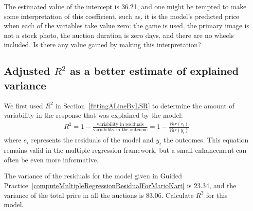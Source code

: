\begin{exercisewrap}
\begin{nexercise}
The estimated value of the intercept is 36.21, and one might be tempted to make some interpretation of this coefficient, such as, it is the model's predicted price when each of the variables take value zero: the game is used, the primary image is not a stock photo, the auction duration is zero days, and there are no wheels included. Is there any value gained by making this interpretation?\footnotemark
\end{nexercise}
\end{exercisewrap}


\subsection{Adjusted $R^2$ as a better estimate of explained variance}


We first used $R^2$ in Section~\ref{fittingALineByLSR} to determine the amount of variability in the response that was explained by the model:
\begin{align*}
R^2 = 1 - \frac{\text{variability in residuals}}{\text{variability in the outcome}}
	= 1 - \frac{Var(e_i)}{Var(y_i)}
\end{align*}
where $e_i$ represents the residuals of the model and $y_i$ the outcomes. This equation remains valid in the multiple regression framework, but a small enhancement can often be even more informative.

\begin{exercisewrap}
\begin{nexercise} \label{computeUnadjustedR2ForAllPredictorsInMarioKart}
The variance of the residuals for the model given in Guided Practice~\ref{computeMultipleRegressionResidualForMarioKart} is 23.34, and the variance of the total price in all the auctions is 83.06. Calculate $R^2$ for this model.\footnotemark
\end{nexercise}
\end{exercisewrap}

